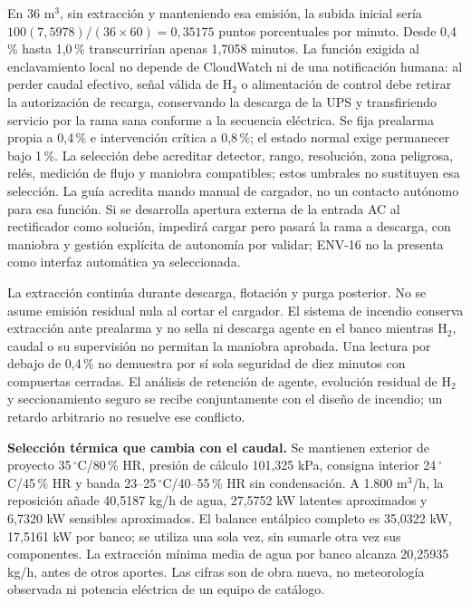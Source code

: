 En 36 m$^3$, sin extracción y manteniendo esa emisión, la subida inicial sería $100(7,5978)/(36\times60)=0,35175$ puntos porcentuales por minuto. Desde 0,4\,\% hasta 1,0\,\% transcurrirían apenas 1,7058 minutos. La función exigida al enclavamiento local no depende de CloudWatch ni de una notificación humana: al perder caudal efectivo, señal válida de H$_2$ o alimentación de control debe retirar la autorización de recarga, conservando la descarga de la UPS y transfiriendo servicio por la rama sana conforme a la secuencia eléctrica. Se fija prealarma propia a 0,4\,\% e intervención crítica a 0,8\,\%; el estado normal exige permanecer bajo 1\,\%. La selección debe acreditar detector, rango, resolución, zona peligrosa, relés, medición de flujo y maniobra compatibles; estos umbrales no sustituyen esa selección. La guía acredita mando manual de cargador, no un contacto autónomo para esa función. Si se desarrolla apertura externa de la entrada AC al rectificador como solución, impedirá cargar pero pasará la rama a descarga, con maniobra y gestión explícita de autonomía por validar; ENV-16 no la presenta como interfaz automática ya seleccionada.

La extracción continúa durante descarga, flotación y purga posterior. No se asume emisión residual nula al cortar el cargador. El sistema de incendio conserva extracción ante prealarma y no sella ni descarga agente en el banco mientras H$_2$, caudal o su supervisión no permitan la maniobra aprobada. Una lectura por debajo de 0,4\,\% no demuestra por sí sola seguridad de diez minutos con compuertas cerradas. El análisis de retención de agente, evolución residual de H$_2$ y seccionamiento seguro se recibe conjuntamente con el diseño de incendio; un retardo arbitrario no resuelve ese conflicto.

\textbf{Selección térmica que cambia con el caudal.} Se mantienen exterior de proyecto 35\,$^{\circ}$C/80\,\% HR, presión de cálculo 101,325 kPa, consigna interior 24\,$^{\circ}$C/45\,\% HR y banda 23--25\,$^{\circ}$C/40--55\,\% HR sin condensación. A 1.800 m$^3$/h, la reposición añade 40,5187 kg/h de agua, 27,5752 kW latentes aproximados y 6,7320 kW sensibles aproximados. El balance entálpico completo es 35,0322 kW, 17,5161 kW por banco; se utiliza una sola vez, sin sumarle otra vez sus componentes. La extracción mínima media de agua por banco alcanza 20,25935 kg/h, antes de otros aportes. Las cifras son de obra nueva, no meteorología observada ni potencia eléctrica de un equipo de catálogo.

